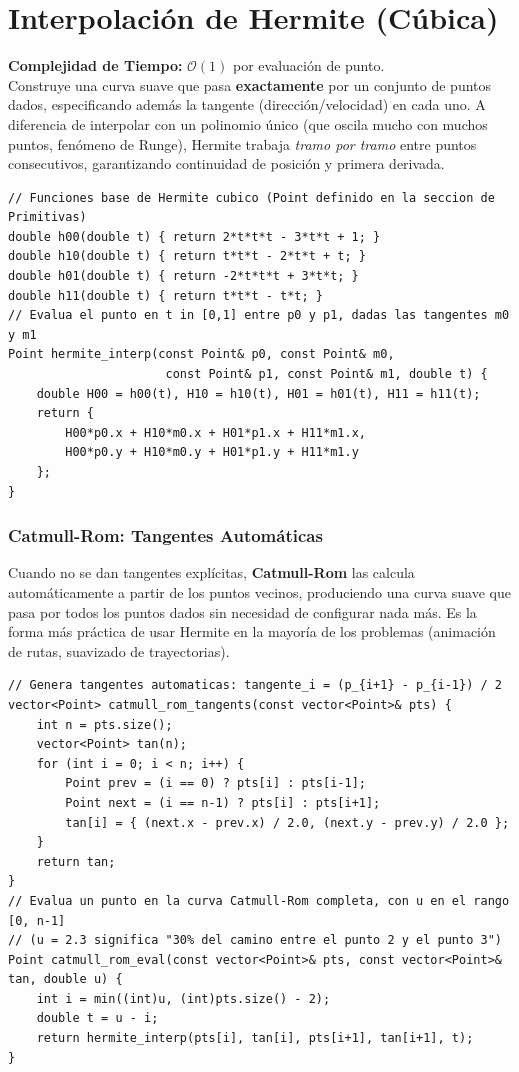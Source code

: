\documentclass[10pt,twocolumn,letterpaper]{report}
\begin{document}
\section{Interpolación de Hermite (Cúbica)}
\textbf{Complejidad de Tiempo:} $\mathcal{O}(1)$ por evaluación de punto. \\
Construye una curva suave que pasa \textbf{exactamente} por un conjunto de puntos dados, especificando además la tangente (dirección/velocidad) en cada uno. A diferencia de interpolar con un polinomio único (que oscila mucho con muchos puntos, fenómeno de Runge), Hermite trabaja \textit{tramo por tramo} entre puntos consecutivos, garantizando continuidad de posición y primera derivada.
\begin{lstlisting}
// Funciones base de Hermite cubico (Point definido en la seccion de Primitivas)
double h00(double t) { return 2*t*t*t - 3*t*t + 1; }
double h10(double t) { return t*t*t - 2*t*t + t; }
double h01(double t) { return -2*t*t*t + 3*t*t; }
double h11(double t) { return t*t*t - t*t; }
// Evalua el punto en t in [0,1] entre p0 y p1, dadas las tangentes m0 y m1
Point hermite_interp(const Point& p0, const Point& m0,
                      const Point& p1, const Point& m1, double t) {
    double H00 = h00(t), H10 = h10(t), H01 = h01(t), H11 = h11(t);
    return {
        H00*p0.x + H10*m0.x + H01*p1.x + H11*m1.x,
        H00*p0.y + H10*m0.y + H01*p1.y + H11*m1.y
    };
}
\end{lstlisting}
\subsubsection{Catmull-Rom: Tangentes Automáticas}
Cuando no se dan tangentes explícitas, \textbf{Catmull-Rom} las calcula automáticamente a partir de los puntos vecinos, produciendo una curva suave que pasa por todos los puntos dados sin necesidad de configurar nada más. Es la forma más práctica de usar Hermite en la mayoría de los problemas (animación de rutas, suavizado de trayectorias).
\begin{lstlisting}
// Genera tangentes automaticas: tangente_i = (p_{i+1} - p_{i-1}) / 2
vector<Point> catmull_rom_tangents(const vector<Point>& pts) {
    int n = pts.size();
    vector<Point> tan(n);
    for (int i = 0; i < n; i++) {
        Point prev = (i == 0) ? pts[i] : pts[i-1];
        Point next = (i == n-1) ? pts[i] : pts[i+1];
        tan[i] = { (next.x - prev.x) / 2.0, (next.y - prev.y) / 2.0 };
    }
    return tan;
}
// Evalua un punto en la curva Catmull-Rom completa, con u en el rango [0, n-1]
// (u = 2.3 significa "30% del camino entre el punto 2 y el punto 3")
Point catmull_rom_eval(const vector<Point>& pts, const vector<Point>& tan, double u) {
    int i = min((int)u, (int)pts.size() - 2);
    double t = u - i;
    return hermite_interp(pts[i], tan[i], pts[i+1], tan[i+1], t);
}
\end{lstlisting}
\end{document}
